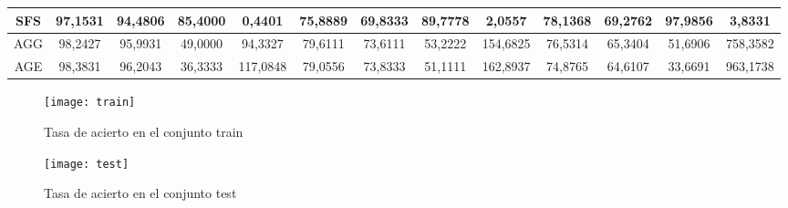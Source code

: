 \documentclass[12pt]{article}
\begin{document}
\begin{table}[H]
{\begin{tabular}{|c|cccc|cccc|cccc|}
SFS  & \multicolumn{1}{c|}{97,1531}                                                  & \multicolumn{1}{c|}{94,4806}                                                 & \multicolumn{1}{c|}{85,4000} & 0,4401   & \multicolumn{1}{c|}{75,8889}                                                  & \multicolumn{1}{c|}{69,8333}                                                 & \multicolumn{1}{c|}{89,7778} & 2,0557   & \multicolumn{1}{c|}{78,1368}                                                  & \multicolumn{1}{c|}{69,2762}                                                 & \multicolumn{1}{c|}{97,9856} & 3,8331   \\ \hline
AGG  & \multicolumn{1}{c|}{98,2427}                                                  & \multicolumn{1}{c|}{95,9931}                                                 & \multicolumn{1}{c|}{49,0000} & 94,3327  & \multicolumn{1}{c|}{79,6111}                                                  & \multicolumn{1}{c|}{73,6111}                                                 & \multicolumn{1}{c|}{53,2222} & 154,6825 & \multicolumn{1}{c|}{76,5314}                                                  & \multicolumn{1}{c|}{65,3404}                                                 & \multicolumn{1}{c|}{51,6906} & 758,3582 \\ \hline
AGE  & \multicolumn{1}{c|}{98,3831}                                                  & \multicolumn{1}{c|}{96,2043}                                                 & \multicolumn{1}{c|}{36,3333} & 117,0848 & \multicolumn{1}{c|}{79,0556}                                                  & \multicolumn{1}{c|}{73,8333}                                                 & \multicolumn{1}{c|}{51,1111} & 162,8937 & \multicolumn{1}{c|}{74,8765}                                                  & \multicolumn{1}{c|}{64,6107}                                                 & \multicolumn{1}{c|}{33,6691} & 963,1738 \\ \hline
\end{tabular}}
\end{table}


\begin{figure}[H]
\centering
\texttt{[image: train]}
\caption{Tasa de acierto en el conjunto train} \label{fig:train}
\end{figure}

\begin{figure}[H]
\centering
\texttt{[image: test]}
\caption{Tasa de acierto en el conjunto test} \label{fig:test}
\end{figure}
\end{document}
